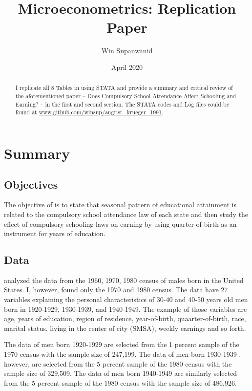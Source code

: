 \documentclass{article}
\title{Microeconometrics:  Replication Paper}
\author{Win Supanwanid}
\date{April 2020}
\begin{document}
\renewcommand{\abstractname}{\vspace{-\baselineskip}} %
\maketitle

\begin{abstract}

I replicate all 8 Tables in \cite{angrist1991} using STATA and provide a summary and critical review of the aforementioned paper -- Does Compulsory School Attendance Affect Schooling and Earning? --
in the first and second section. The STATA codes and Log files could be found at \url{www.github.com/winsup/angrist_krueger_1991}.

\end{abstract}


\section{Summary}

\subsection{Objectives}

The objective of \cite{angrist1991} is to state that seasonal pattern of educational attainment is related to the compulsory school attendance law of each state
and then study the effect of compulsory schooling laws on earning by using quarter-of-birth as an instrument for years of education.



\subsection{Data}

 \cite{angrist1991} analyzed the data from the 1960, 1970, 1980 census of males born in the United States. I, however, found only the 1970 and 1980 census. 
The data have 27 variables explaining the personal characteristics of 30-40 and 40-50 years old men born in 1920-1929, 1930-1939, and 1940-1949. The example of those variables are age, years of education, region of residence, year-of-birth, quaarter-of-birth, race, marital status, living in the center of city (SMSA), weekly earnings and so forth.

The data of men born 1920-1929 are selected from the 1 percent sample of the 1970 census with the sample size of 247,199. The data of men born 1930-1939 , however, are selected from the 5 percent sample of the 1980 census with the sample size of 329,509. The data of men born 1940-1949 are similarly selected from the 5 percent sample of the 1980 census with the sample size of 486,926.
\end{document}

